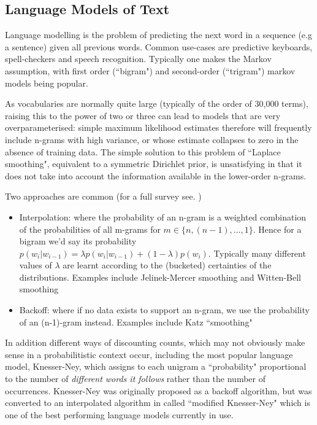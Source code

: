 

\subsection{Language Models of Text}

Language modelling is the problem of predicting the next word in a sequence (e.g a sentence) given all previous words. Common use-cases are predictive keyboards, spell-checkers and speech recognition. Typically one makes the Markov assumption, with first order (``bigram") and second-order (``trigram") markov models being popular.

As vocabularies are normally quite large (typically of the order of 30,000 terms), raising this to the power of two or three can lead to models that are very overparameterised: simple maximum likelihood estimates therefore will frequently include n-grams with high variance, or whose estimate collapses to zero in the absence of training data. The simple solution to this problem  of ``Laplace smoothing", equivalent to a symmetric Dirichlet prior, is unsatisfying in that it does not take into account the information available in the lower-order n-grams.

Two approaches are common (for a full survey see\cite{Goodman2001}. )
\begin{itemize}
    \item Interpolation: where the probability of an n-gram is a weighted combination of the probabilities of all m-grams for $m \in \{n, (n-1), \ldots, 1\}$. Hence for a bigram we'd say its probability $p(w_i|w_{i-1}) = \lambda p(w_i|w_{i-1}) + (1 - \lambda) p(w_i)$. Typically many different values of $\lambda$ are learnt according to the (bucketed) certainties of the distributions. Examples include Jelinek-Mercer smoothing and Witten-Bell smoothing    
\item Backoff: where if no data exists to support an n-gram, we use the probability of an (n-1)-gram instead. Examples include Katz ``smoothing"
\end{itemize}

In addition different ways of discounting counts, which may not obviously make sense in a probabilitistic context occur, including the most popular language model, Knesser-Ney, which assigns to each unigram a ``probability" proportional to the number of \emph{different words it follows} rather than the number of occurrences. Knesser-Ney was originally proposed as a backoff algorithm, but was converted to an interpolated algorithm in \cite{Goodman2001} called ``modified Knesser-Ney" which is one of the best performing language models currently in use.

